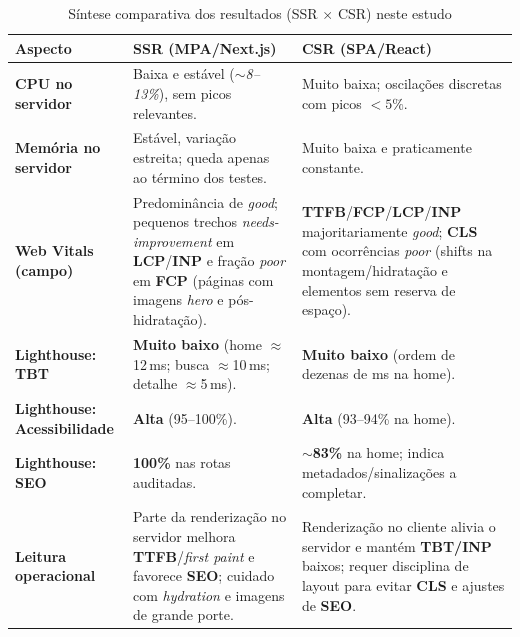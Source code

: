 \begin{table}[H]
\centering
\caption{Síntese comparativa dos resultados (SSR $\times$ CSR) neste estudo}
\label{tab:comparativo-ssr-csr}
\begin{tabular}{|p{4.2cm}|p{5.2cm}|p{5.2cm}|}
\hline
\textbf{Aspecto} & \textbf{SSR (MPA/Next.js)} & \textbf{CSR (SPA/React)} \\
\hline
\textbf{CPU no servidor} & Baixa e estável (\textit{$\sim$8--13\%}), sem picos relevantes. & Muito baixa; oscilações discretas com picos $<5\%$. \\
\hline
\textbf{Memória no servidor} & Estável, variação estreita; queda apenas ao término dos testes. & Muito baixa e praticamente constante. \\
\hline
\textbf{Web Vitals (campo)} & Predominância de \textit{good}; pequenos trechos \textit{needs-improvement} em \textbf{LCP}/\textbf{INP} e fração \textit{poor} em \textbf{FCP} (páginas com imagens \emph{hero} e pós-hidratação). & \textbf{TTFB}/\textbf{FCP}/\textbf{LCP}/\textbf{INP} majoritariamente \textit{good}; \textbf{CLS} com ocorrências \textit{poor} (shifts na montagem/hidratação e elementos sem reserva de espaço). \\
\hline
\textbf{Lighthouse: TBT} & \textbf{Muito baixo} (home $\approx$12\,ms; busca $\approx$10\,ms; detalhe $\approx$5\,ms). & \textbf{Muito baixo} (ordem de dezenas de ms na home). \\
\hline
\textbf{Lighthouse: Acessibilidade} & \textbf{Alta} (95--100\%). & \textbf{Alta} (93--94\% na home). \\
\hline
\textbf{Lighthouse: SEO} & \textbf{100\%} nas rotas auditadas. & \textbf{$\sim$83\%} na home; indica metadados/sinalizações a completar. \\
\hline
\textbf{Leitura operacional} & Parte da renderização no servidor melhora \textbf{TTFB}/\emph{first paint} e favorece \textbf{SEO}; cuidado com \emph{hydration} e imagens de grande porte. & Renderização no cliente alivia o servidor e mantém \textbf{TBT/INP} baixos; requer disciplina de layout para evitar \textbf{CLS} e ajustes de \textbf{SEO}. \\
\hline
\end{tabular}
\end{table}

